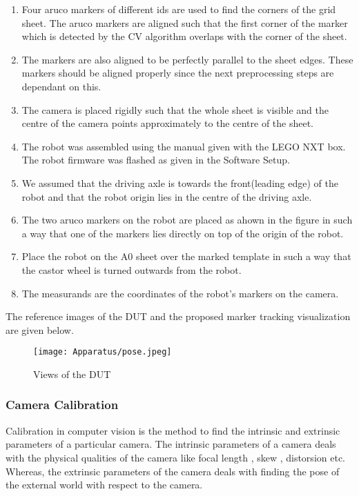 \begin{enumerate}
	\item
	Four aruco markers of different ids are used to find the corners of the grid sheet. The aruco markers are aligned such that the first corner of the marker which is detected by the CV algorithm overlaps with the corner of the sheet.
	\item
	The markers are also aligned to be perfectly parallel to the sheet edges. These markers should be aligned properly since the next preprocessing steps are dependant on this.
	\item
	The camera is placed rigidly such that the whole sheet is visible and the centre of the camera points approximately to the centre of the sheet.	
    \item
    The robot was assembled using the manual given with the LEGO NXT box. The robot firmware was flashed as given in the Software Setup. 
    \item
    We assumed that the driving axle is towards the front(leading edge) of the robot and that the robot origin lies in the centre of the driving axle.
    \item
    The two aruco markers on the robot are placed as ahown in the figure in such a way that one of the markers lies directly on top of the origin of the robot.
    \item
    Place the robot on the A0 sheet over the marked template in such a way that the castor wheel is turned outwards from the robot.
    \item
	The measurands are the coordinates of the robot's markers on the camera.
    
\end{enumerate}
\vspace{0.5cm}

The reference images of the DUT and the proposed marker tracking visualization are given below.

\begin{figure}[h]
	\centering
\texttt{[image: Apparatus/pose.jpeg]}
\caption{ Views of the DUT}
\end{figure}

\subsubsection{Camera Calibration}


Calibration in computer vision is the method to find the intrinsic and extrinsic parameters of a particular camera. The intrinsic parameters of a camera deals with the physical qualities of the camera like focal length , skew , distorsion etc. Whereas, the extrinsic parameters of the camera deals with finding the pose of the external world with respect to the camera.\\

